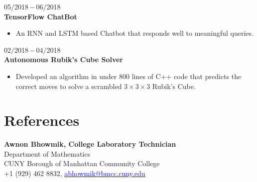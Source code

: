 \documentclass[a4paper, 12pt]{article}
\begin{document}
    \begin{flushleft}
    	05$/$2018\,$-$\,06$/$2018\\
    	\textbf{TensorFlow ChatBot}
    	\begin{itemize}
    		\item An RNN and LSTM based Chatbot that responds well to meaningful queries.
    	\end{itemize}
    \end{flushleft}
    
    \begin{flushleft}
    	02$/$2018\,$-$\,04$/$2018\\
    	\textbf{Autonomous Rubik's Cube Solver}
    	\begin{itemize}
    		\item Developed an algorithm in under $800$ lines of C++ code that predicts the correct moves to solve
a scrambled $3\times3\times3$ Rubik's Cube.
    	\end{itemize}
    \end{flushleft}
    
    \section*{References}
    \begin{flushleft}
    \textbf{Awnon Bhowmik, College Laboratory Technician}\\
    Department of Mathematics\\
    CUNY Borough of Manhattan Community College\\
    +1 (929) 462 8832, \href{abhowmik@bmcc.cuny.edu}{\textcolor{blue}{\underline{abhowmik@bmcc.cuny.edu}}}
    \end{flushleft}
\end{document}
